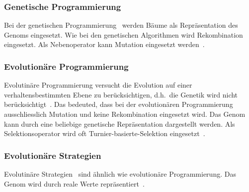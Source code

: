       \subsubsection{Genetische Programmierung\label{item:genProg}}

        Bei der genetischen Programmierung~\cite{book:genProg} werden Bäume als Repräsentation des Genoms eingesetzt.
        Wie bei den genetischen Algorithmen wird Rekombination eingesetzt.
        Als Nebenoperator kann Mutation eingesetzt werden~\cite[S.147]{book:evAlgo}.

      \subsubsection{Evolutionäre Programmierung\label{item:evProg}}

        Evolutinäre Programmierung versucht die Evolution auf einer verhaltensbestimmten Ebene zu berücksichtigen,
        d.h.\ die Genetik wird nicht berücksichtigt~\cite[S.140]{book:evAlgo}.
        Das bedeuted, dass bei der evolutionären Programmierung~\cite{book:artIntSimEv}
        ausschliesslich Mutation und keine Rekombination eingesetzt wird.
        Das Genom kann durch eine beliebige genetische Repräsentation dargestellt werden.
        Als Selektionsoperator wird oft Turnier-basierte-Selektion eingesetzt~\cite[S.33]{book:bioInspired}.

      \subsubsection{Evolutionäre Strategien\label{item:evStrat}}

        Evolutinäre Strategien~\cite{book:evStrat} sind ähnlich wie evolutionäre Programmierung.
        Das Genom wird durch reale Werte repräsentiert~\cite[S.134]{book:evAlgo}.
